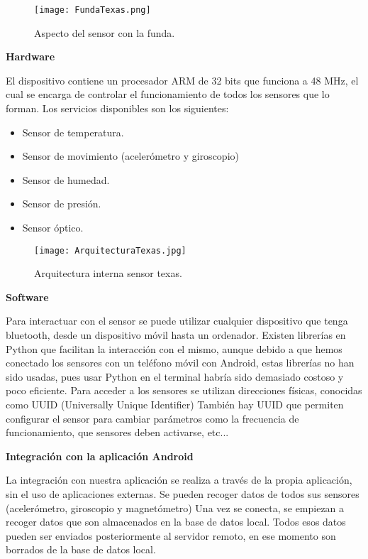 \documentclass[11pt,spanish]{article}
\begin{document}
\begin{figure}[h!]
  \centering
  \texttt{[image: FundaTexas.png]}
  \caption{Aspecto del sensor con la funda.}
\end{figure}

{\bf Hardware}
\newline

El dispositivo contiene un procesador ARM de 32 bits que funciona a 48 MHz, el cual se encarga de controlar el funcionamiento de todos los sensores que lo forman. Los servicios disponibles son los siguientes:

\begin{itemize}
  \item Sensor de temperatura.
  \item Sensor de movimiento (acelerómetro y giroscopio)
  \item Sensor de humedad.
  \item Sensor de presión.
  \item Sensor óptico.
\end{itemize}

\begin{figure}[h!]
  \centering
  \texttt{[image: ArquitecturaTexas.jpg]}
  \caption{Arquitectura interna sensor texas.}
\end{figure}
\newpage

{\bf Software}
\newline

Para interactuar con el sensor se puede utilizar cualquier dispositivo que tenga bluetooth, desde un dispositivo móvil hasta un ordenador. Existen librerías en Python que facilitan la interacción con el mismo, aunque debido a que hemos conectado los sensores con un teléfono móvil con Android, estas librerías no han sido usadas, pues usar Python en el terminal habría sido demasiado costoso y poco eficiente. Para acceder a los sensores se utilizan direcciones físicas, conocidas como UUID (Universally Unique Identifier) También hay UUID que permiten configurar el sensor para cambiar parámetros como la frecuencia de funcionamiento, que sensores deben activarse, etc...
\newline

{\bf Integración con la aplicación Android}
\newline

La integración con nuestra aplicación se realiza a través de la propia aplicación, sin el uso de aplicaciones externas. Se pueden recoger datos de todos sus sensores (acelerómetro, giroscopio y magnetómetro) Una vez se conecta, se empiezan a recoger datos que son almacenados en la base de datos local. Todos esos datos pueden ser enviados posteriormente al servidor remoto, en ese momento son borrados de la base de datos local.
\end{document}
